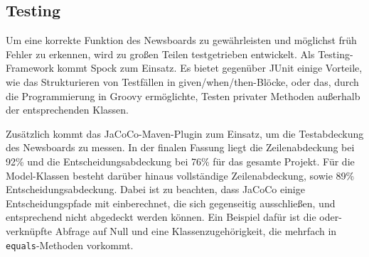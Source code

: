 \subsection{Testing}
Um eine korrekte Funktion des Newsboards zu gewährleisten und möglichst früh
Fehler zu erkennen, wird zu großen Teilen testgetrieben entwickelt.
Als Testing-Framework kommt Spock zum Einsatz. Es bietet gegenüber JUnit einige Vorteile,
wie das Strukturieren von Testfällen in given/when/then-Blöcke,
oder das, durch die Programmierung in Groovy ermöglichte, Testen privater Methoden
außerhalb der entsprechenden Klassen.

Zusätzlich kommt das JaCoCo-Maven-Plugin zum Einsatz, um die Testabdeckung des Newsboards
zu messen. In der finalen Fassung liegt die Zeilenabdeckung bei 92\%
und die Entscheidungsabdeckung bei 76\% für das gesamte Projekt.
Für die Model-Klassen besteht darüber hinaus vollständige Zeilenabdeckung,
sowie 89\% Entscheidungsabdeckung. Dabei ist zu beachten,
dass JaCoCo einige Entscheidungspfade mit einberechnet,
die sich gegenseitig ausschließen, und entsprechend
nicht abgedeckt werden können. Ein Beispiel dafür ist die oder-verknüpfte Abfrage
auf Null und eine Klassenzugehörigkeit, die mehrfach in \texttt{equals}-Methoden vorkommt.
